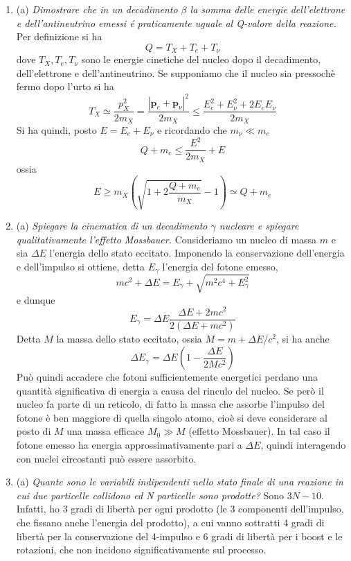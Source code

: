 \documentclass{article}
\renewcommand{\a}{(a)}
\renewcommand{\t}[1]{\textit{ #1}}
\renewcommand{\vec}[1]{\mathbf{#1}}
\begin{document}
\begin{enumerate}
{	ad interazioni deboli, elettromagnetiche, forti?} Per le interazioni deboli e elettromagnetiche la vita media dipende marcatamente dall'energia ($10^3$ s per il decadimento $\alpha$, $10^{-16}$ s per il decadimento $\beta$). Per le interazioni forti è dell'ordine di $10^{23}$ s.
\item\a\t{Dimostrare che in un decadimento $\beta$ la somma delle energie dell'elettrone e
	dell'antineutrino emessi é praticamente uguale al Q-valore della reazione.} Per definizione si ha
\[Q=T_X+T_e+T_\nu\]
dove $T_X,T_e,T_\nu$ sono le energie cinetiche del nucleo dopo il decadimento, dell'elettrone e dell'antineutrino. Se supponiamo che il nucleo sia pressochè fermo dopo l'urto si ha
\[T_X\simeq\frac{p_X^2}{2m_X}=\frac{|\vec{p}_e+\vec{p}_\nu|^2}{2m_X}\leq\frac{E_e^2+E_\nu^2+2E_eE_\nu}{2m_X}\]
Si ha quindi, posto $E=E_e+E_\nu$ e ricordando che $m_\nu\ll m_e$
\[Q+m_e\leq\frac{E^2}{2m_X}+E\]
ossia
\[E\geq m_X\left(\sqrt{1+2\frac{Q+m_e}{m_X}}-1\right)\simeq Q+m_e\]
\item\a\t{Spiegare la cinematica di un decadimento $\gamma$ nucleare e spiegare qualitativamente
	l'effetto Mossbauer.} Consideriamo un nucleo di massa $m$ e sia $\Delta E$ l'energia dello stato eccitato. Imponendo la conservazione dell'energia e dell'impulso si ottiene, detta $E_\gamma$ l'energia del fotone emesso,
\[mc^2+\Delta E=E_\gamma+\sqrt{m^2c^4+E_\gamma^2}\]
e dunque
\[E_\gamma=\Delta E\frac{\Delta E+2mc^2}{2(\Delta E+mc^2)}\]
Detta $M$ la massa dello stato eccitato, ossia $M=m+\Delta E/c^2$, si ha anche
\[\Delta E_\gamma=\Delta E\left(1-\frac{\Delta E}{2Mc^2}\right)\]
Può quindi accadere che fotoni sufficientemente energetici perdano una quantità significativa di energia a causa del rinculo del nucleo. Se però il nucleo fa parte di un reticolo, di fatto la massa che assorbe l'impulso del fotone è ben maggiore di quella singolo atomo, cioè si deve considerare al posto di $M$ una massa efficace $M_0\gg M$ (effetto Mossbauer). In tal caso il fotone emesso ha energia approssimativamente pari a $\Delta E$, quindi interagendo con nuclei circostanti può essere assorbito.
\item\a\t{Quante sono le variabili indipendenti nello stato finale di una reazione in cui due
	particelle collidono ed N particelle sono prodotte?} Sono $3N-10$. Infatti, ho 3 gradi di libertà per ogni prodotto (le 3 componenti dell'impulso, che fissano anche l'energia del prodotto), a cui vanno sottratti 4 gradi di libertà per la conservazione del 4-impulso e 6 gradi di libertà per i boost e le rotazioni, che non incidono significativamente sul processo.

\end{enumerate}
\end{document}
